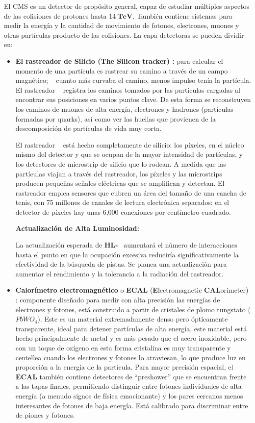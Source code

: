 El CMS es un detector de propósito general, capaz de estudiar múltiples aspectos de las colisiones de protones hasta $14 ~ \textbf{TeV}$. También contiene sistemas para medir la energía y la cantidad de movimiento de fotones, electrones, muones y otras partículas producto de las colisiones. La capa detectoras se pueden dividir en: 
\begin{itemize}
\item  \textbf{El rastreador de Silicio (The Silicon tracker) :} para calcular el momento de una partícula es rastrear su camino a través de un campo magnético; ~ cuanto más curvaba el camino, menos impulso tenía la partícula. El rastreador \CMS ~ registra los caminos tomados por las partículas cargadas al encontrar sus posiciones en varios puntos clave. De esta forma se reconstruyen los caminos de muones de alta energía, electrones y hadrones (partículas formadas por quarks), así como ver las huellas que provienen de la descomposición de partículas de vida muy corta.

El rastreador \CMS ~ está hecho completamente de silicio: los píxeles, en el núcleo mismo del detector y que se ocupan de la mayor intensidad de partículas, y los detectores de microstrip de silicio que lo rodean. A medida que las partículas viajan a través del rastreador, los píxeles y las microstrips producen pequeñas señales eléctricas que se amplifican y detectan. El rastreador emplea sensores que cubren un área del tamaño de una cancha de tenis, con 75 millones de canales de lectura electrónica separados: en el detector de píxeles hay unas 6,000 conexiones por centímetro cuadrado.

\textbf{Actualización de Alta Luminosidad: }

La actualización esperada de \textbf{HL-}\LHC~ aumentará el número de interacciones hasta el punto en que la ocupación excesiva reduciría significativamente la efectividad de la búsqueda de pistas. Se planea una actualización para aumentar el rendimiento y la tolerancia a la radiación del rastreador.

\item \textbf{Calorímetro electromagnético} o \textbf{ECAL} (\textbf{E}lectromagnetic \textbf{CAL}orimeter) : componente diseñado para medir con alta precisión las energías de electrones y fotones, está construido a partir de cristales de plomo tungstato ($PbWO_4$). Este es un material extremadamente denso pero ópticamente transparente, ideal para detener partículas de alta energía, este material está hecho principalmente de metal y es más pesado que el acero inoxidable, pero con un toque de oxígeno en esta forma cristalina es muy transparente y centellea cuando los electrones y fotones lo atraviesan, lo que produce luz en proporción a la energía de la partícula. Para mayor precisión espacial, el \textbf{ECAL} también contiene detectores de ``preshower'' que se encuentran frente a las tapas finales, permitiendo distinguir entre fotones individuales de alta energía (a menudo signos de física emocionante) y los pares cercanos menos interesantes de fotones de baja energía. Está calibrado para discriminar entre de piones y fotones.


\end{itemize}
